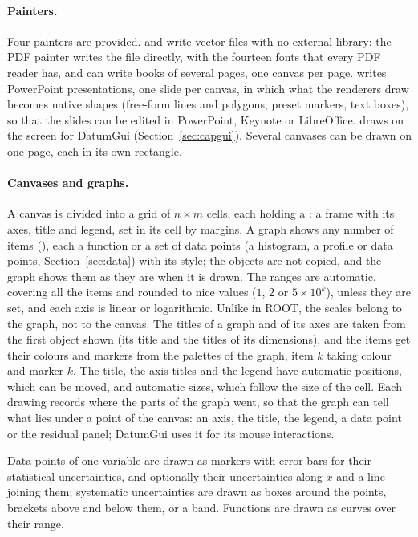 \paragraph{Painters.}
Four painters are provided.  and  write vector files with no external library: the
PDF painter writes the file directly, with the fourteen fonts that every PDF reader has, and can write books of
several pages, one canvas per page.  writes PowerPoint presentations, one slide per canvas, in which
what the renderers draw becomes native shapes (free-form lines and polygons, preset markers, text boxes), so that the
slides can be edited in PowerPoint, Keynote or LibreOffice.  draws on the screen for DatumGui
(Section~\ref{sec:capgui}). Several canvases can be drawn on one page, each in its own rectangle.

\paragraph{Canvases and graphs.}
A canvas is divided into a grid of $n \times m$ cells, each holding a : a frame with its axes, title and
legend, set in its cell by margins. A graph shows any number of items (), each a function or a set of
data points (a histogram, a profile or data points, Section~\ref{sec:data}) with its style; the objects are not
copied, and the graph shows them as they are when it is drawn. The ranges are automatic, covering all the items and
rounded to nice values ($1$, $2$ or $5\times 10^k$), unless they are set, and each axis is linear or logarithmic.
Unlike in ROOT, the scales belong to the graph, not to the canvas. The titles of a graph and of its axes are taken from the first object shown (its title
and the titles of its dimensions), and the items get their colours and markers from the palettes of the graph, item
$k$ taking colour and marker $k$. The title, the axis titles and the legend have automatic positions, which can be
moved, and automatic sizes, which follow the size of the cell. Each drawing records where the parts of the graph
went, so that the graph can tell what lies under a point of the canvas: an axis, the title, the legend, a data point
or the residual panel; DatumGui uses it for its mouse interactions.

Data points of one variable are drawn as markers with error bars for their statistical uncertainties, and
optionally their uncertainties along $x$ and a line joining them; systematic uncertainties are drawn as boxes around
the points, brackets above and below them, or a band. Functions are drawn as curves over their range.

